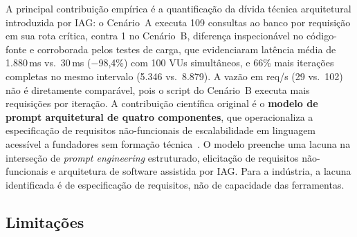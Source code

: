\documentclass[sigconf]{acmart}
\begin{document}
A principal contribuição empírica é a quantificação da dívida técnica arquitetural introduzida por IAG:
o Cenário~A executa 109 consultas ao banco por requisição em sua rota crítica, contra
1 no Cenário~B, diferença inspecionável no código-fonte e corroborada pelos testes de
carga, que evidenciaram latência média de 1.880\,ms vs.\ 30\,ms (−98,4\%) com 100
VUs simultâneos, e 66\% mais iterações completas no mesmo intervalo (5.346 vs.\ 8.879). A vazão em req/s (29 vs.\ 102) não é diretamente comparável, pois o script do Cenário~B executa mais requisições por iteração.
A contribuição científica original é o \textbf{modelo de prompt arquitetural de
quatro componentes}, que operacionaliza a especificação de requisitos não-funcionais
de escalabilidade em linguagem acessível a fundadores sem formação
técnica~\cite{White2023,Nascimento2024,Vogelsang2024}. O modelo preenche uma lacuna
na interseção de \textit{prompt engineering} estruturado, elicitação de requisitos
não-funcionais e arquitetura de software assistida por IAG. Para a indústria, a
lacuna identificada é de especificação de requisitos, não de capacidade das
ferramentas.

\subsection{Limitações}
\label{sec:limitacoes}
\end{document}

